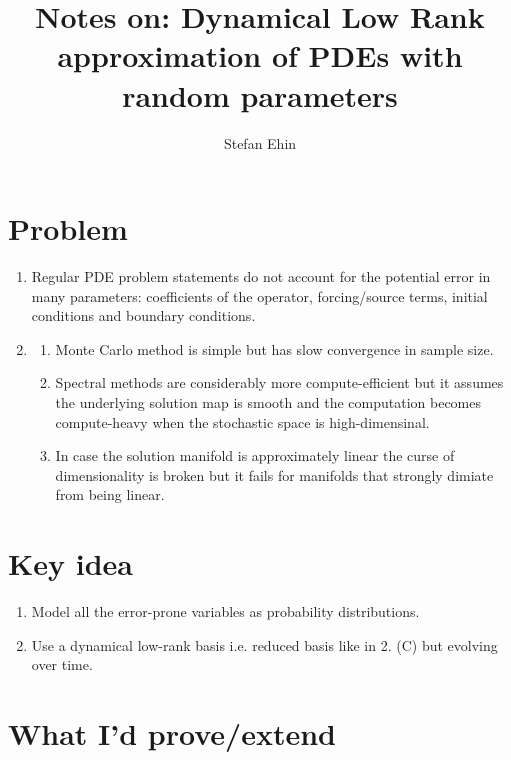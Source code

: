 \documentclass{article}
\author{Stefan Ehin}
\title{Notes on: Dynamical Low Rank approximation of PDEs with random parameters}
\begin{document}
\maketitle

\section*{Problem}
\begin{enumerate}
    \item Regular PDE problem statements do not account for the potential error in many parameters: coefficients of the operator, forcing/source terms, initial conditions and boundary conditions.
    \item
    \begin{enumerate}
        \item Monte Carlo method is simple but has slow convergence in sample size.
        \item Spectral methods are considerably more compute-efficient but it assumes the underlying solution map is smooth and the computation becomes compute-heavy when the stochastic space is high-dimensinal.
        \item In case the solution manifold is approximately linear the curse of dimensionality is broken but it fails for manifolds that strongly dimiate from being linear.
    \end{enumerate}
\end{enumerate}

\section*{Key idea}
\begin{enumerate}
    \item Model all the error-prone variables as probability distributions.
    \item Use a dynamical low-rank basis i.e. reduced basis like in 2. (C) but evolving over time.
\end{enumerate}

\section*{What I'd prove/extend}
	
\end{document}
